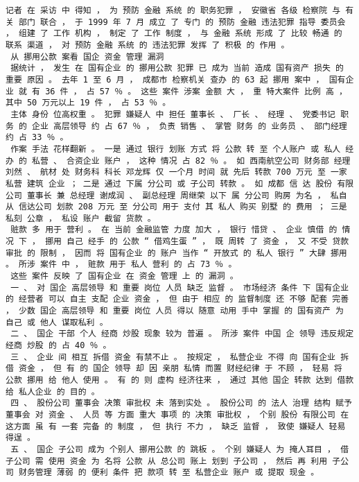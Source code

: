 \documentclass{article}
\begin{document}
\begin{Verbatim}[commandchars=\\\{\}]
 记者 在 采访 中 得知 ， 为 预防 金融 系统 的 职务犯罪 ， 安徽省 各级 检察院 与 有关 部门 联合 ， 于 1999 年 7 月 成立 了 专门 的 预防 金融 违法犯罪 指导 委员会 ， 组建 了 工作 机构 ， 制定 了 工作 制度 ， 与 金融 系统 形成 了 比较 畅通 的 联系 渠道 ， 对 预防 金融 系统 的 违法犯罪 发挥 了 积极 的 作用 。 
 从 挪用公款 案看 国企 资金 管理 漏洞 
 据统计 ， 发生 在 国有企业 的 挪用公款 犯罪 已 成为 当前 造成 国有资产 损失 的 重要 原因 。 去年 1 至 6 月 ， 成都市 检察机关 查办 的 63 起 挪用 案中 ， 国有企业 就 有 36 件 ， 占 57 ％ 。 这些 案件 涉案 金额 大 ， 重 特大案件 比例 高 ， 其中 50 万元以上 19 件 ， 占 53 ％ 。 
 主体 身份 位高权重 。 犯罪 嫌疑人 中 担任 董事长 、 厂长 、 经理 、 党委书记 职务 的 企业 高层领导 约 占 67 ％ ， 负责 销售 、 掌管 财务 的 业务员 、 部门经理 约 占 33 ％ 。 
 作案 手法 花样翻新 。 一是 通过 银行 划账 方式 将 公款 转 至 个人账户 或 私人 经办 的 私营 、 合资企业 账户 ， 这种 情况 占 82 ％ 。 如 西南航空公司 财务部 经理 刘然 、 航材 处 财务科 科长 邓龙辉 仅 一个月 时间 就 先后 转款 700 万元 至 一家 私营 建筑 企业 ； 二是 通过 下属 分公司 或 子公司 转款 。 如 成都 信 达 股份 有限公司 董事长 兼 总经理 谢成润 、 副总经理 周继荣 以下 属 分公司 购房 为名 ， 私自 从 信达公司 划款 208 万元 至 分公司 用于 支付 其 私人 购买 别墅 的 费用 ； 三是 私刻 公章 ， 私设 账户 截留 货款 。 
 赃款 多 用于 营利 。 在 当前 金融监管 力度 加大 ， 银行 惜贷 、 企业 慎借 的 情况 下 ， 挪用 自己 经手 的 公款 “ 借鸡生蛋 ” ， 既 周转 了 资金 ， 又 不受 贷款 审批 的 限制 ， 因而 将 国有企业 的 账户 当作 “ 开放式 的 私人 银行 ” 大肆 挪用 。 所涉 案件 中 ， 赃款 用于 私人 营利 的 占 73 ％ 。 
 这些 案件 反映 了 国有企业 在 资金 管理 上 的 漏洞 。 
 一 、 对 国企 高层领导 和 重要 岗位 人员 缺乏 监督 。 市场经济 条件 下 国有企业 的 经营者 可以 自主 支配 企业 资金 ， 但 由于 相应 的 监督制度 还 不够 配套 完善 ， 少数 国企 高层领导 和 重要 岗位 人员 得以 随意 动用 手中 掌握 的 国有资产 为 自己 或 他人 谋取私利 。 
 二 、 国企 干部 个人 经商 炒股 现象 较为 普遍 。 所涉 案件 中国 企 领导 违反规定 经商 炒股 的 占 40 ％ 。 
 三 、 企业 间 相互 拆借 资金 有禁不止 。 按规定 ， 私营企业 不得 向 国有企业 拆借 资金 ， 但 有 的 国企 领导 却 因 亲朋 私情 而置 财经纪律 于 不顾 ， 轻易 将 公款 挪用 给 他人 使用 。 有 的 则 虚构 经济往来 ， 通过 其他 国企 转款 达到 借款 给 私人企业 的 目的 。 
 四 、 股份公司 董事会 决策 审批权 未 落到实处 。 股份公司 的 法人 治理 结构 赋予 董事会 对 资金 、 人员 等 方面 重大 事项 的 决策 审批权 ， 个别 股份 有限公司 在 这方面 虽 有 一套 完备 的 制度 ， 但 执行 不力 ， 缺乏 监督 ， 致使 嫌疑人 轻易 得逞 。 
 五 、 国企 子公司 成为 个别人 挪用公款 的 跳板 。 个别 嫌疑人 为 掩人耳目 ， 借 子公司 需 使用 资金 为 名将 公款 从 总公司 账上 划到 子公司 ， 然后 再 利用 子公司 财务管理 薄弱 的 便利 条件 把 款项 转 至 私营企业 账户 或 提取 现金 。 

\end{Verbatim}
\end{document}
